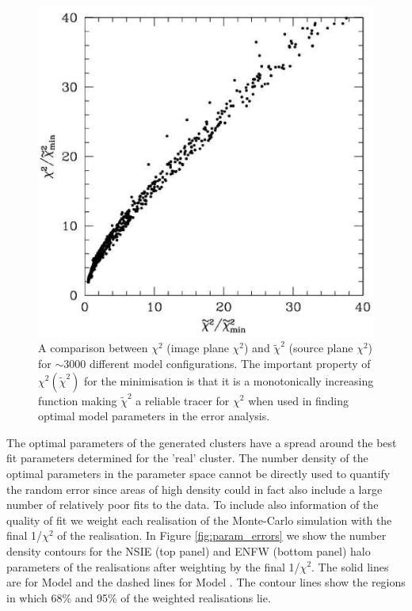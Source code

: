 \documentclass[useAMS,usenatbib]{mn2e}
\newcounter{one}   \setcounter{one}{1}
\newcounter{two}   \setcounter{two}{2}
\begin{document}
\begin{figure}
  \centering
  \includegraphics[height=\columnwidth]{figs/chi2.ps}
  \caption{A comparison between $\chi^2$ (image plane $\chi^2$) and
  $\widetilde{\chi}^2$ (source plane $\chi^2$) for $\sim$3000
  different model configurations. The important property of
  $\chi^2(\widetilde{\chi}^2)$ for the minimisation is that it is a
  monotonically increasing function making $\widetilde{\chi}^2$ a
  reliable tracer for $\chi^2$ when used in finding optimal model
  parameters in the error analysis.}
  \label{fig:chi2}
\end{figure}

The optimal parameters of the generated clusters have a spread around
the best fit parameters determined for the 'real' cluster. The number
density of the optimal parameters in the parameter space cannot be
directly used to quantify the random error since areas of high density
could in fact also include a large number of relatively poor fits to
the data. To include also information of the quality of fit we weight
each realisation of the Monte-Carlo simulation with the final
1/$\chi^2$ of the realisation. In Figure \ref{fig:param_errors} we
show the number density contours for the NSIE (top panel) and ENFW
(bottom panel) halo parameters of the realisations after weighting by
the final 1/$\chi^2$. The solid lines are for Model  and
the dashed lines for Model . The contour lines show the
regions in which 68\% and 95\% of the weighted realisations lie.\\
\end{document}
